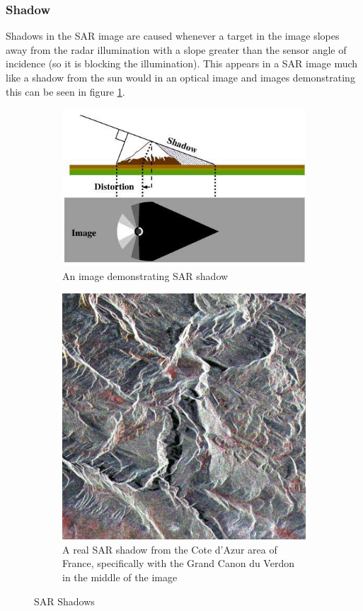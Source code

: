 \subsubsection{Shadow}
Shadows in the SAR image are caused whenever a target in the image slopes away from the radar illumination with a slope greater than the sensor angle of incidence (so it is blocking the illumination). This appears in a SAR image much like a shadow from the sun would in an optical image \cite{Shadow} and images demonstrating this can be seen in figure \ref{fig:sar_shadow}.
\begin{figure}
\centering
	\begin{subfigure}{.5\textwidth}
		\centering
		\includegraphics[width=0.9\linewidth]{../figures/esa_shadow}
		\caption{An image demonstrating SAR shadow}
	\end{subfigure}%
	\begin{subfigure}{.5\textwidth}
		\centering
		\includegraphics[width=0.9\linewidth]{../figures/esa_shadow_real}	
		\caption{A real SAR shadow from the Cote d'Azur area of France, specifically with the Grand Canon du Verdon in the middle of the image}
	\end{subfigure}
	\caption{SAR Shadows \cite{Shadow}}
	\label{fig:sar_shadow}
\end{figure}
